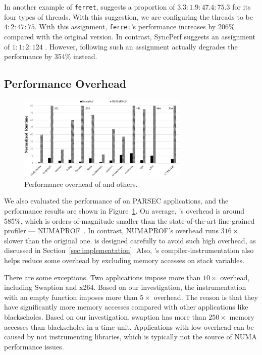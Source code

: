 In another example of \texttt{ferret}, \NP{} suggests a proportion of $3.3 :1.9 :47.4 :75.3$ for its four types of threads. With this suggestion, we are configuring the threads to be $4 : 2 : 47 : 75$. With this assignment, \texttt{ferret}'s performance increases by 206\% compared with the original version. In contrast, SyncPerf suggests an assignment of $1:1:2:124$
. However, following such an assignment  actually degrades the performance by 354\% instead. 

\subsection{Performance Overhead}
\label{sec:performance}
\begin{figure}[!h]
    \centering
    \includegraphics[width=3.2in]{paper/figures/performance.pdf}
    \caption{Performance overhead of \NP{} and others.\label{fig:performance}}  
\end{figure}

We also evaluated the performance of \NP{} on PARSEC applications, and the performance results are shown in Figure~\ref{fig:performance}. On average, \NP{}'s overhead is around 585\%, which is orders-of-magnitude smaller than the state-of-the-art fine-grained profiler --- NUMAPROF~\cite{valat:2018:numaprof}. In contrast, NUMAPROF's overhead runs $316\times$ slower than the original one. \NP{} is designed carefully to avoid such high overhead, as discussed in Section~\ref{sec:implementation}. Also, \NP{}'s compiler-instrumentation also helps reduce some overhead by excluding memory accesses on stack variables. 

There are some exceptions. Two applications impose more than $10\times$ overhead, including Swaption and x264. Based on our investigation, the instrumentation with an empty function imposes more than $5\times$ overhead. The reason is that they have significantly more  memory accesses compared with other applications like blackscholes. Based on our investigation, swaption has more than $250\times$ memory accesses than  blackscholes in a time unit. Applications with low overhead can be caused by not instrumenting libraries, which is typically not the source of NUMA performance issues. 

